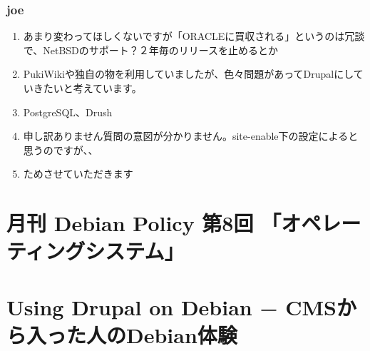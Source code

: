 \documentclass[cjk,dvipdfmx,10pt,compress,%
hyperref={bookmarks=true,bookmarksnumbered=true,bookmarksopen=false,%
colorlinks=false,%
pdftitle={第 68 回 関西 Debian 勉強会},%
pdfauthor={倉敷・のがた・佐々木・かわだ},%
pdfsubject={資料},%
}]{beamer}
\begin{document}
\begin{frame}
  \frametitle{ joe }
  \begin{enumerate}
  \item あまり変わってほしくないですが「ORACLEに買収される」というのは冗談で、NetBSDのサポート？２年毎のリリースを止めるとか
  \item PukiWikiや独自の物を利用していましたが、色々問題があってDrupalにしていきたいと考えています。
  \item PostgreSQL、Drush
  \item 申し訳ありません質問の意図が分かりません。site-enable下の設定によると思うのですが、、
  \item ためさせていただきます
  \end{enumerate}
\end{frame}



\section{月刊 Debian Policy 第8回 「オペレーティングシステム」}


\section{Using Drupal on Debian − CMSから入った人のDebian体験}

\end{document}
